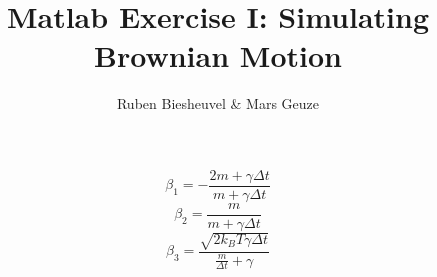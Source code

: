 \documentclass[12pt]{article}
\begin{document}
	\title{Matlab Exercise I: Simulating Brownian Motion}
	\author{Ruben Biesheuvel \& Mars Geuze}
	\maketitle


\section{}
\begin{equation}
	\beta_1 = -\frac{2m + \gamma\Delta t}{m+\gamma\Delta t}
\end{equation}
\begin{equation}
	\beta_2 = \frac{m}{m+\gamma\Delta t}
\end{equation}
\begin{equation}
	\beta_3 = \frac{\sqrt{2k_BT\gamma\Delta t}}{\frac{m}{\Delta t}+\gamma}
\end{equation}

\newpage\section{}



\newpage\section{}


\end{document}
